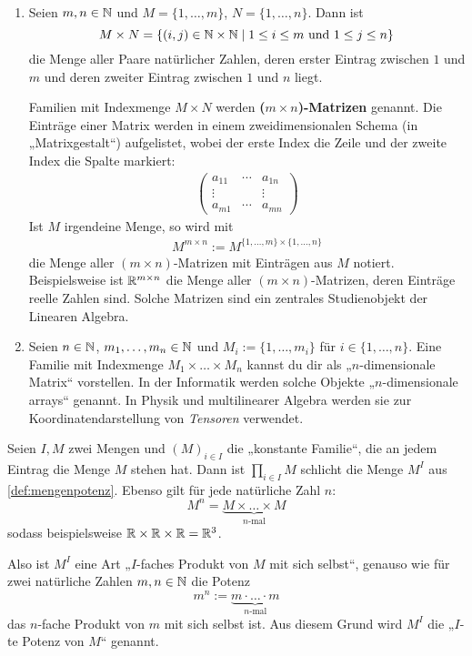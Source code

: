 \begin{bsp} \label{bsp:matrizen}  \quad
    \begin{enumerate}
        \item Seien $m,n\in \mathbb N$ und $M=\{1,\dots , m\}$, $N=\{1,\dots,n\}$. Dann ist
            \[ M\times N = \{ (i,j) \in \mathbb N\times \mathbb N \mid 1\le i\le m \ \text{und}\ 1\le j \le n \} \]
        die Menge aller Paare natürlicher Zahlen, deren erster Eintrag zwischen $1$ und $m$ und deren zweiter Eintrag zwischen $1$ und $n$ liegt.

        Familien mit Indexmenge $M\times N$ werden \textbf{($m\times n$)-Matrizen} genannt. Die Einträge einer Matrix werden in einem zweidimensionalen Schema (in „Matrixgestalt“) aufgelistet, wobei der erste Index die Zeile und der zweite Index die Spalte markiert:
        \begin{align*}
            \begin{pmatrix}
                a_{11} & \cdots & a_{1n} \\
                \vdots && \vdots \\
                a_{m1} & \cdots & a_{mn}
            \end{pmatrix}
        \end{align*}
        Ist $M$ irgendeine Menge, so wird mit
        \begin{align*}
            M^{m\times n} := M^{\{1,\dots , m\}\times \{1,\dots , n\}}
        \end{align*}
        die Menge aller $(m\times n)$-Matrizen mit Einträgen aus $M$ notiert. Beispielsweise ist $\mathbb R^{m\times n}$ die Menge aller $(m\times n)$-Matrizen, deren Einträge reelle Zahlen sind. Solche Matrizen sind ein zentrales Studienobjekt der Linearen Algebra.
        \item Seien $n\in \mathbb N$, $m_1,\dots , m_n\in \mathbb N$ und $M_i:=\{1,\dots , m_i\}$ für $i\in \{1,\dots , n\}$. Eine Familie mit Indexmenge $M_1\times\ldots\times M_n$ kannst du dir als „$n$-dimensionale Matrix“ vorstellen. In der Informatik werden solche Objekte „$n$-dimensionale arrays“ genannt. In Physik und multilinearer Algebra werden sie zur Koordinatendarstellung von \emph{Tensoren} verwendet.
    \end{enumerate}
\end{bsp}


\begin{bem}
    Seien $I,M$ zwei Mengen und $(M)_{i\in I}$ die „konstante Familie“, die an jedem Eintrag die Menge $M$ stehen hat. Dann ist $\prod_{i\in I} M$ schlicht die Menge $M^I$ aus \cref{def:mengenpotenz}. Ebenso gilt für jede natürliche Zahl $n$:
        \[ M^n = \underbrace{M\times\ldots\times M}_{\text{$n$-mal}} \]
    sodass beispielsweise $\mathbb R\times \mathbb R\times \mathbb R= \mathbb R^3$.

    Also ist $M^I$ eine Art „$I$-faches Produkt von $M$ mit sich selbst“, genauso wie für zwei natürliche Zahlen $m,n\in \mathbb N$ die Potenz
        \[ m^n := \underbrace{m\cdot\ldots\cdot m}_{\text{$n$-mal}}\]
    das $n$-fache Produkt von $m$ mit sich selbst ist. Aus diesem Grund wird $M^I$ die „$I$-te Potenz von $M$“ genannt.
\end{bem}


